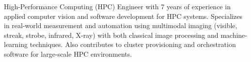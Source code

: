 
High-Performance Computing (HPC) Engineer with 7 years of experience in applied
computer vision and software development for HPC systems. Specializes in
real-world measurement and automation using multimodal imaging (visible,
streak, strobe, infrared, X-ray) with both classical image processing and
machine-learning techniques. Also contributes to cluster provisioning and
orchestration software for large-scale HPC environments.

